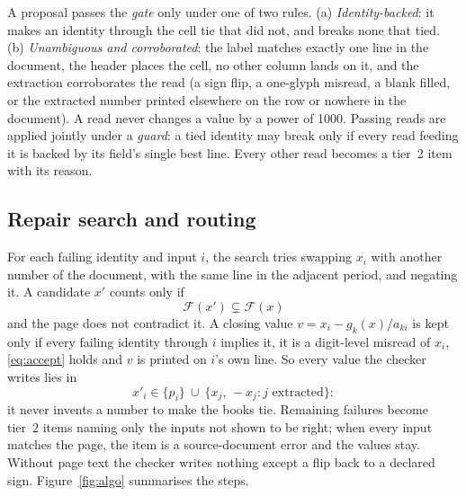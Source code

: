 \documentclass[10pt,twocolumn]{article}
\newcommand{\Fail}{\mathcal{F}}
\begin{document}
A proposal passes the \emph{gate} only under one of two rules. (a) \emph{Identity-backed}: it makes an identity through the cell tie that did not, and breaks none that tied. (b) \emph{Unambiguous and corroborated}: the label matches exactly one line in the document, the header places the cell, no other column lands on it, and the extraction corroborates the read (a sign flip, a one-glyph misread, a blank filled, or the extracted number printed elsewhere on the row or nowhere in the document). A read never changes a value by a power of 1000. Passing reads are applied jointly under a \emph{guard}: a tied identity may break only if every read feeding it is backed by its field's single best line. Every other read becomes a tier~2 item with its reason.

\subsection{Repair search and routing}
For each failing identity and input $i$, the search tries swapping $x_i$ with another number of the document, with the same line in the adjacent period, and negating it. A candidate $x'$ counts only if
\begin{equation}\label{eq:accept}
\Fail(x')\subsetneq\Fail(x)
\end{equation}
and the page does not contradict it. A closing value $v=x_i-g_k(x)/a_{ki}$ is kept only if every failing identity through $i$ implies it, it is a digit-level misread of $x_i$, \eqref{eq:accept} holds and $v$ is printed on $i$'s own line. So every value the checker writes lies in
\begin{equation}\label{eq:allowed}
x'_i \in \{p_i\}\ \cup\ \{x_j,\,-x_j : j \text{ extracted}\}:
\end{equation}
it never invents a number to make the books tie. Remaining failures become tier~2 items naming only the inputs not shown to be right; when every input matches the page, the item is a source-document error and the values stay. Without page text the checker writes nothing except a flip back to a declared sign.
Figure~\ref{fig:algo} summarises the steps.


\end{document}
